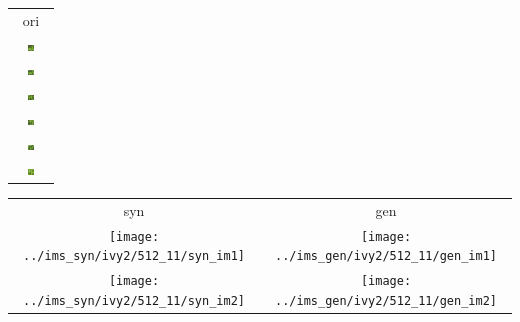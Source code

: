 \documentclass[letter]{article}
\begin{document}
\newpage

\begin{table}[h!]
	\centering
	\begin{tabular}{c}
		ori\tabularnewline
		\includegraphics[width=0.17\textwidth]{../data/ivy2/512/1} \tabularnewline		\includegraphics[width=0.17\textwidth]{../data/ivy2/512/2} \tabularnewline		\includegraphics[width=0.17\textwidth]{../data/ivy2/512/3} \tabularnewline		\includegraphics[width=0.17\textwidth]{../data/ivy2/512/4} \tabularnewline		\includegraphics[width=0.17\textwidth]{../data/ivy2/512/5} \tabularnewline		\includegraphics[width=0.17\textwidth]{../data/ivy2/512/6} \tabularnewline
	\end{tabular}
	\begin{tabular}{cc}
		syn & gen\tabularnewline
		\texttt{[image: ../ims\_syn/ivy2/512\_11/syn\_im1]} & \texttt{[image: ../ims\_gen/ivy2/512\_11/gen\_im1]} \tabularnewline
		\texttt{[image: ../ims\_syn/ivy2/512\_11/syn\_im2]} & \texttt{[image: ../ims\_gen/ivy2/512\_11/gen\_im2]} \tabularnewline

\end{tabular}
\end{table}
\end{document}
